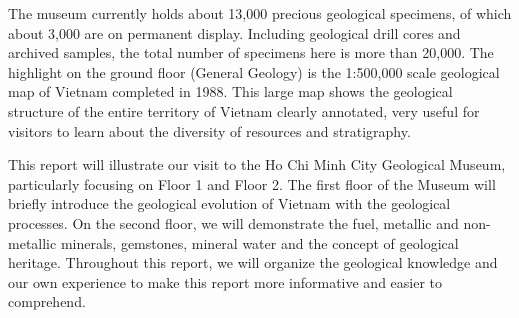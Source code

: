 The museum currently holds about 13,000 precious geological specimens, of which about 3,000 are on permanent display. Including geological drill cores and archived samples, the total number of specimens here is more than 20,000. The highlight on the ground floor (General Geology) is the 1:500,000 scale geological map of Vietnam completed in 1988. This large map shows the geological structure of the entire territory of Vietnam clearly annotated, very useful for visitors to learn about the diversity of resources and stratigraphy.

This report will illustrate our visit to the Ho Chi Minh City Geological Museum, particularly focusing on Floor 1 and Floor 2. The first floor of the Museum will briefly introduce the geological evolution of Vietnam with the geological processes. On the second floor, we will demonstrate the fuel, metallic and non-metallic minerals, gemstones, mineral water and the concept of geological heritage. Throughout this report, we will organize the geological knowledge and our own experience to make this report more informative and easier to comprehend.